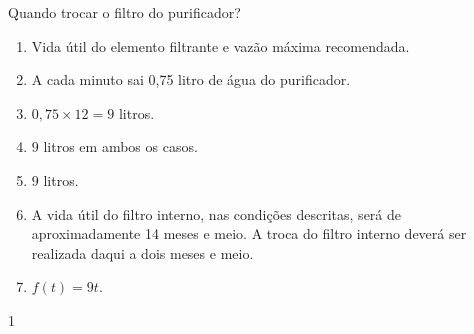 \begin{answer}{Quando trocar o filtro do purificador?}
{
\begin{enumerate}
\item Vida útil do elemento filtrante e vazão máxima recomendada.
\item A cada minuto sai 0,75 litro de água do purificador.
\item $0,75\times12=9$ litros.
\item $9$ litros em ambos os casos.
\item $9$ litros.
\item A vida útil do filtro interno, nas condições descritas, será de aproximadamente 14 meses e meio. A troca do filtro interno deverá ser realizada daqui a dois meses e meio.
\item $f(t)=9t$.

\begin{figure}[H]
\centering


\end{figure}
\end{enumerate}
}{1}
\end{answer}

\label{\detokenize{AF107-3::doc}}\label{\detokenize{AF107-3:praticando}}

